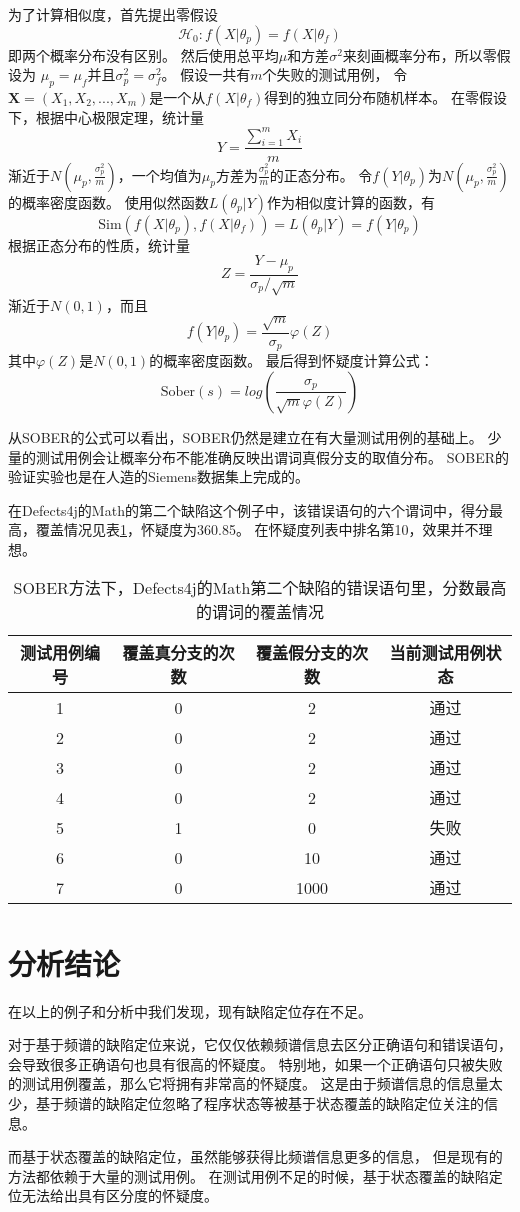 为了计算相似度，首先提出零假设
$$\mathcal{H}_0 : f(X|\theta_p) = f(X|\theta_f)$$
即两个概率分布没有区别。
然后使用总平均$\mu$和方差$\sigma^2$来刻画概率分布，所以零假设为
$\mu_p = \mu_f$并且$\sigma_p^2 = \sigma_f^2$。
假设一共有$m$个失败的测试用例，
令$\textbf{X} = (X_1, X_2, ..., X_m)$是一个从$f(X|\theta_f)$得到的独立同分布随机样本。
在零假设下，根据中心极限定理，统计量
$$
Y = \frac{\sum_{i = 1}^m X_i}{m}
$$
渐近于$N(\mu_p, \frac{\sigma_p^2}{m})$，一个均值为$\mu_p$方差为$\frac{\sigma_p^2}{m}$的正态分布。
令$f(Y|\theta_p)$为$N(\mu_p, \frac{\sigma_p^2}{m})$的概率密度函数。
使用似然函数$L(\theta_p | Y)$作为相似度计算的函数，有
$$
\mathrm{Sim}(f(X|\theta_p), f(X|\theta_f)) = L(\theta_p | Y) = f(Y|\theta_p)
$$
根据正态分布的性质，统计量
$$
Z = \frac{Y - \mu_p}{\sigma_p / \sqrt{m}}
$$
渐近于$N(0,1)$，而且
$$
f(Y|\theta_p) = \frac{\sqrt{m}}{\sigma_p}\varphi(Z)
$$
其中$\varphi(Z)$是$N(0,1)$的概率密度函数。
最后得到怀疑度计算公式：
$$
\mathrm{Sober}(s) = log\left( \frac{\sigma_p}{\sqrt{m}\varphi(Z)} \right)\label{eq:sober}
$$

从SOBER的公式可以看出，SOBER仍然是建立在有大量测试用例的基础上。
少量的测试用例会让概率分布不能准确反映出谓词真假分支的取值分布。
SOBER的验证实验也是在人造的Siemens数据集上完成的。

在Defects4j的Math的第二个缺陷这个例子中，该错误语句的六个谓词中，得分最高，覆盖情况见表\ref{math_2_sober}，怀疑度为360.85。
在怀疑度列表中排名第10，效果并不理想。

\begin{table}
\centering
\begin{tabular}{|c|c|c|c|}
\hline
测试用例编号 & 覆盖真分支的次数 & 覆盖假分支的次数 & 当前测试用例状态 \\
\hline
1 & 0 & 2 & 通过 \\
\hline
2 & 0 & 2 & 通过 \\
\hline
3 & 0 & 2 & 通过 \\
\hline
4 & 0 & 2 & 通过 \\
\hline
5 & 1 & 0 & 失败 \\
\hline
6 & 0 & 10 & 通过 \\
\hline
7 & 0 & 1000 & 通过 \\
\hline
\end{tabular}
\caption{SOBER方法下，Defects4j的Math第二个缺陷的错误语句里，分数最高的谓词的覆盖情况}
\label{math_2_sober}
\end{table}

\section{分析结论}

在以上的例子和分析中我们发现，现有缺陷定位存在不足。

对于基于频谱的缺陷定位来说，它仅仅依赖频谱信息去区分正确语句和错误语句，
会导致很多正确语句也具有很高的怀疑度。
特别地，如果一个正确语句只被失败的测试用例覆盖，那么它将拥有非常高的怀疑度。
这是由于频谱信息的信息量太少，基于频谱的缺陷定位忽略了程序状态等被基于状态覆盖的缺陷定位关注的信息。

而基于状态覆盖的缺陷定位，虽然能够获得比频谱信息更多的信息，
但是现有的方法都依赖于大量的测试用例。
在测试用例不足的时候，基于状态覆盖的缺陷定位无法给出具有区分度的怀疑度。
